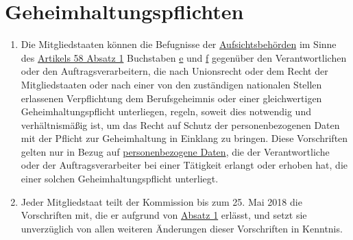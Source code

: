 \chapter{Geheimhaltungspflichten}
\label{ch:90}


\begin{enumerate}

  \item Die Mitgliedstaaten können die Befugnisse der \hyperref[itm:04-21]{Aufsichtsbehörden} im Sinne des \hyperref[itm:58-1]{Artikels 58
   Absatz 1} Buchstaben \hyperref[itm:58-1e]{e} und \hyperref[itm:58-1f]{f} gegenüber den Verantwortlichen oder den
   Auftragsverarbeitern, die nach Unionsrecht oder dem Recht der Mitgliedstaaten oder nach einer von den zuständigen
   nationalen Stellen erlassenen Verpflichtung dem Berufsgeheimnis oder einer gleichwertigen Geheimhaltungspflicht
   unterliegen, regeln, soweit dies notwendig und verhältnismäßig ist, um das Recht auf Schutz der personenbezogenen
   Daten mit der Pflicht zur Geheimhaltung in Einklang zu bringen. Diese Vorschriften gelten nur in Bezug auf
   \hyperref[itm:04-1]{personenbezogene Daten}, die der Verantwortliche oder der Auftragsverarbeiter bei einer Tätigkeit erlangt oder
   erhoben hat, die einer solchen Geheimhaltungspflicht unterliegt.
  \label{itm:90-1}

  \item Jeder Mitgliedstaat teilt der Kommission bis zum 25. Mai 2018 die Vorschriften mit, die er aufgrund von
   \hyperref[itm:90-1]{Absatz 1} erlässt, und setzt sie unverzüglich von allen weiteren Änderungen dieser Vorschriften
    in Kenntnis.
  \label{itm:90-2}

\end{enumerate}


